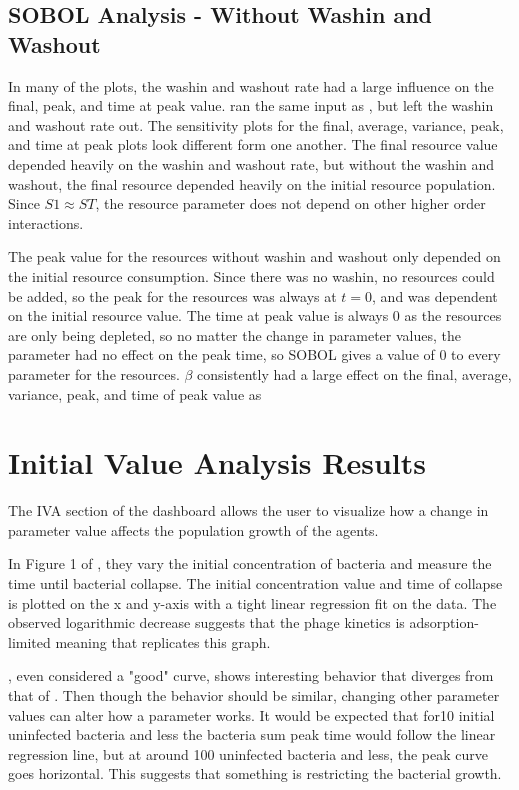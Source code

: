 \subsection{SOBOL Analysis - Without Washin and Washout}
In many of the plots, the washin and washout rate had a large influence on the final, peak, and time at peak value. 
 ran the same input as , but left the washin and washout rate out. 
The sensitivity plots for the final, average, variance, peak, and time at peak plots look different form one another. 
The final resource value depended heavily on the washin and washout rate, but without the washin and washout, the final resource depended heavily on the initial resource population. 
Since $S1 \approx ST$, the resource parameter does not depend on other higher order interactions. 

The peak value for the resources without washin and washout only depended on the initial resource consumption. 
Since there was no washin, no resources could be added, so the peak for the resources was always at $t=0$, and was dependent on the initial resource value. 
The time at peak value is always 0 as the resources are only being depleted, so no matter the change in parameter values, the parameter had no effect on the peak time, so SOBOL gives a value of 0 to every parameter for the resources. 
$\beta$ consistently had a large effect on the final, average, variance, peak, and time of peak value as 


\section{Initial Value Analysis Results}
\label{sec:results:initial_value_analysis}

The IVA section of the dashboard allows the user to visualize how a change in parameter value affects the population growth of the agents. 

In Figure 1 of \citet{mullaExtremeDiversityPhage2024}, they vary the initial concentration of bacteria and measure the time until bacterial collapse. 
The initial concentration value and time of collapse is plotted on the x and y-axis with a tight linear regression fit on the data. 
The observed logarithmic decrease suggests that the phage kinetics is adsorption-limited meaning that 
 replicates this graph. 

, even considered a "good" curve, shows interesting behavior that diverges from that of . 
Then though the behavior should be similar, changing other parameter values can alter how a parameter works. 
It would be expected that for10 initial uninfected bacteria and less the bacteria sum peak time would follow the linear regression line, but at around 100 uninfected bacteria and less, the peak curve goes horizontal. 
This suggests that something is restricting the bacterial growth. 

